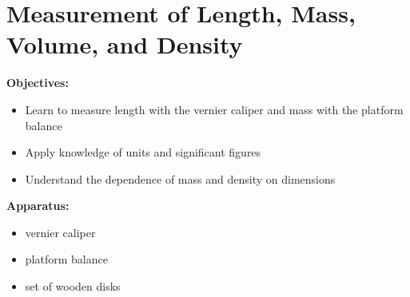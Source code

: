 
\section{Measurement of Length, Mass, Volume, and Density}

\makelabheader %

\vspace{0.2in}
{\noindent \bf Objectives:} \begin{itemize}

\item Learn to measure length with the vernier caliper and mass with the platform balance 
\item Apply knowledge of units and significant figures 
\item Understand the dependence of mass and density on dimensions

\end{itemize}

{\noindent \bf Apparatus:} \begin{itemize}

\item vernier caliper 
\item platform balance 
\item set of wooden disks

\end{itemize}

